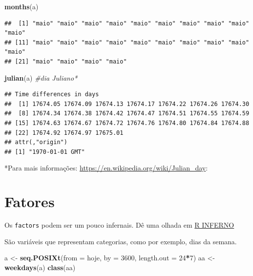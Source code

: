 \documentclass[]{book}
\newenvironment{Shaded}{\begin{snugshade}}{\end{snugshade}}
\newcommand{\KeywordTok}[1]{\textcolor[rgb]{0.13,0.29,0.53}{\textbf{#1}}}
\newcommand{\DataTypeTok}[1]{\textcolor[rgb]{0.13,0.29,0.53}{#1}}
\newcommand{\DecValTok}[1]{\textcolor[rgb]{0.00,0.00,0.81}{#1}}
\newcommand{\StringTok}[1]{\textcolor[rgb]{0.31,0.60,0.02}{#1}}
\newcommand{\CommentTok}[1]{\textcolor[rgb]{0.56,0.35,0.01}{\textit{#1}}}
\newcommand{\OperatorTok}[1]{\textcolor[rgb]{0.81,0.36,0.00}{\textbf{#1}}}
\newcommand{\NormalTok}[1]{#1}
\begin{document}
\begin{Shaded}
\begin{Highlighting}[]
\KeywordTok{months}\NormalTok{(a)}
\end{Highlighting}
\end{Shaded}

\begin{verbatim}
##  [1] "maio" "maio" "maio" "maio" "maio" "maio" "maio" "maio" "maio" "maio"
## [11] "maio" "maio" "maio" "maio" "maio" "maio" "maio" "maio" "maio" "maio"
## [21] "maio" "maio" "maio" "maio"
\end{verbatim}

\begin{Shaded}
\begin{Highlighting}[]
\KeywordTok{julian}\NormalTok{(a) }\CommentTok{#dia Juliano*}
\end{Highlighting}
\end{Shaded}

\begin{verbatim}
## Time differences in days
##  [1] 17674.05 17674.09 17674.13 17674.17 17674.22 17674.26 17674.30
##  [8] 17674.34 17674.38 17674.42 17674.47 17674.51 17674.55 17674.59
## [15] 17674.63 17674.67 17674.72 17674.76 17674.80 17674.84 17674.88
## [22] 17674.92 17674.97 17675.01
## attr(,"origin")
## [1] "1970-01-01 GMT"
\end{verbatim}

*Para mais informações: \url{https://en.wikipedia.org/wiki/Julian_day}:

\section{Fatores}\label{fatores}

Os \texttt{factors} podem ser um pouco infernais. Dê uma olhada em
\href{http://www.burns-stat.com/documents/books/the-r-inferno/}{R
INFERNO}

São variáveis que representam categorias, como por exemplo, dias da
semana.

\begin{Shaded}
\begin{Highlighting}[]
\NormalTok{a <-}\StringTok{ }\KeywordTok{seq.POSIXt}\NormalTok{(}\DataTypeTok{from =}\NormalTok{ hoje, }\DataTypeTok{by =} \DecValTok{3600}\NormalTok{, }\DataTypeTok{length.out =} \DecValTok{24}\OperatorTok{*}\DecValTok{7}\NormalTok{)}
\NormalTok{aa <-}\StringTok{ }\KeywordTok{weekdays}\NormalTok{(a)}
\KeywordTok{class}\NormalTok{(aa)}
\end{Highlighting}
\end{Shaded}
\end{document}

